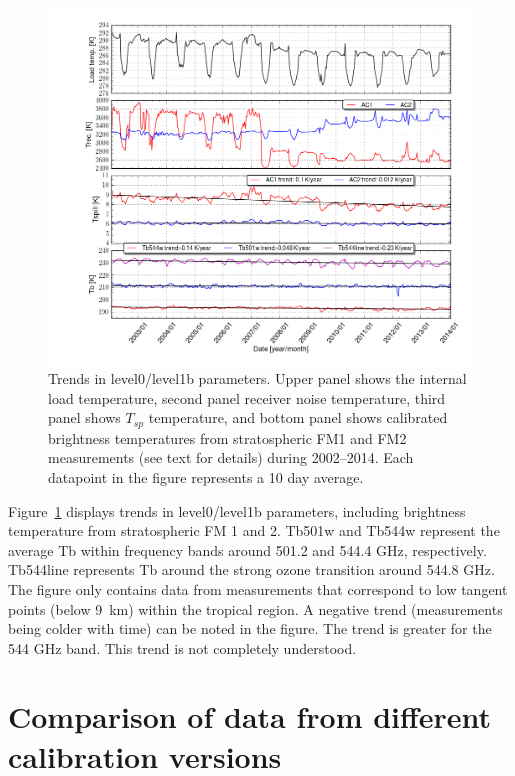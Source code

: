 \begin{figure}
\includegraphics[width=14cm]{tspill_trend3.png}
\caption{Trends in level0/level1b parameters. Upper panel shows the internal
load temperature,
second panel receiver noise temperature, third panel shows \(T_{sp}\) temperature,
and bottom panel shows calibrated brightness temperatures from stratospheric FM1
and FM2 measurements (see text for details) during 2002--2014. Each datapoint
in the figure represents a 10 day average.}
\label{fig:tbtrend}
\end{figure}


Figure~\ref{fig:tbtrend} displays trends in level0/level1b parameters, including brightness 
temperature from stratospheric FM 1 and 2. Tb501w and Tb544w represent the average
Tb within frequency bands around 501.2 and 544.4 GHz, respectively. Tb544line represents Tb around the
strong ozone transition around 544.8 GHz. The figure only contains data from measurements
that correspond to low tangent points (below 9~km) within the tropical region.
A negative trend (measurements being colder with time) can be noted in the figure.
The trend is greater for the 544 GHz band. This trend is not completely understood.



   
\chapter{Comparison of data from different calibration versions}


